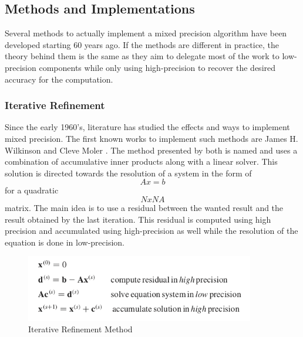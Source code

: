 \subsection{Methods and Implementations}
Several methods to actually implement a mixed precision algorithm have been developed starting 60 years ago. If the methods are different in practice, the theory behind them is the same as they aim to delegate most of the work to low-precision components while only using high-precision to recover the desired accuracy for the computation.
\subsubsection{Iterative Refinement}

Since the early 1960's, literature has studied the effects and ways to implement mixed precision. The first known works to implement such methods are James H. Wilkinson \cite{Wilkinson1994} and Cleve Moler \cite{Moler1967}. The method presented by both is named  and uses a combination of accumulative inner products along with a linear solver. This solution is directed towards the resolution of a system in the form of \begin{equation} Ax=b \end{equation} for a quadratic \begin{equation} NxN A\end{equation} matrix. The main idea is to use a residual between the wanted result and the result obtained by the last iteration. This residual is computed using high precision and accumulated using high-precision as well while the resolution of the equation is done in low-precision.

\begin{figure}[htbp]
	\centering
		\includegraphics[width=10cm]{Figures/IterativeRef.png}
	\caption[Iterative Refinement]{Iterative Refinement Method \cite{Goddeke2007}}
	\label{fig:IterativeRef}
\end{figure}

